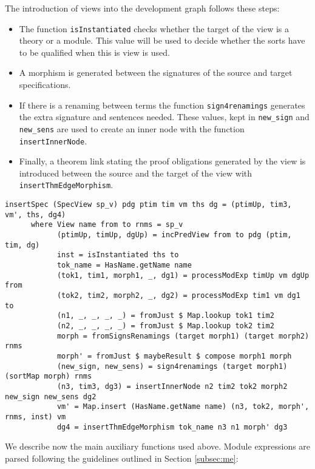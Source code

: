 The introduction of views into the development graph follows these steps:

\begin{itemize}
\item The function \verb"isInstantiated" checks whether the target of the
view is a theory or a module. This value will be used to decide whether the
sorts have to be qualified when this is view is used.
\item A morphism is generated between the signatures of the source and
target specifications.
\item If there is a renaming between terms the function \verb"sign4renamings"
generates the extra signature and sentences needed. These values, kept in
\verb"new_sign" and \verb"new_sens" are used to create an inner node with
the function \verb"insertInnerNode".
\item Finally, a theorem link stating the proof obligations generated by
the view is introduced between the source and the target of the view with
\verb"insertThmEdgeMorphism".
\end{itemize}

{\codesize
\begin{verbatim}
insertSpec (SpecView sp_v) pdg ptim tim vm ths dg = (ptimUp, tim3, vm', ths, dg4)
      where View name from to rnms = sp_v
            (ptimUp, timUp, dgUp) = incPredView from to pdg (ptim, tim, dg)
            inst = isInstantiated ths to
            tok_name = HasName.getName name
            (tok1, tim1, morph1, _, dg1) = processModExp timUp vm dgUp from
            (tok2, tim2, morph2, _, dg2) = processModExp tim1 vm dg1 to
            (n1, _, _, _, _) = fromJust $ Map.lookup tok1 tim2
            (n2, _, _, _, _) = fromJust $ Map.lookup tok2 tim2
            morph = fromSignsRenamings (target morph1) (target morph2) rnms
            morph' = fromJust $ maybeResult $ compose morph1 morph
            (new_sign, new_sens) = sign4renamings (target morph1) (sortMap morph) rnms
            (n3, tim3, dg3) = insertInnerNode n2 tim2 tok2 morph2 new_sign new_sens dg2
            vm' = Map.insert (HasName.getName name) (n3, tok2, morph', rnms, inst) vm
            dg4 = insertThmEdgeMorphism tok_name n3 n1 morph' dg3
\end{verbatim}
}

We describe now the main auxiliary functions used above.
Module expressions are parsed following the guidelines outlined in
Section \ref{subsec:me}:

